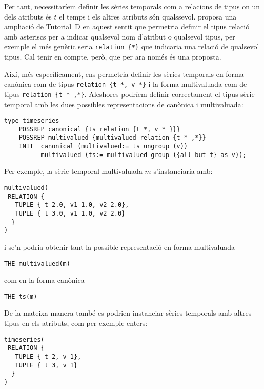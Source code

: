 Per tant, necessitaríem definir les sèries temporals com a relacions
de tipus on un dels atributs és $t$ el temps i els altres atributs són
qualssevol.  \textcite{darwen13:generic_relation_type} proposa una
ampliació de Tutorial~D en aquest sentit que permetria definir el
tipus relació amb asteriscs per a indicar qualsevol nom d'atribut o
qualsevol tipus, per exemple el més genèric seria
\lstinline[style=tutorialD]+relation {*}+ que indicaria una relació de
qualsevol tipus.  Cal tenir en compte, però, que per ara només és una proposta.


Així, més específicament, ens permetria definir les sèries temporals
en forma canònica com de tipus %
\lstinline[style=tutorialD]+relation {t *, v *}+ %
i la forma multivaluada com de tipus %
\lstinline[style=tutorialD]+relation {t * ,*}+.%
Aleshores podríem definir correctament el tipus sèrie temporal amb les
dues possibles representacions de canònica i multivaluada:
\begin{lstlisting}[style=tutorialD]
type timeseries
	POSSREP canonical {ts relation {t *, v * }}}
	POSSREP multivalued {multivalued relation {t * ,*}} 
	INIT  canonical (multivalued:= ts ungroup (v))
	      multivalued (ts:= multivalued group ({all but t} as v));
\end{lstlisting}





Per exemple, la sèrie temporal multivaluada $m$ s'instanciaria amb:
\begin{lstlisting}[style=tutorialD]
multivalued(
 RELATION {
   TUPLE { t 2.0, v1 1.0, v2 2.0},
   TUPLE { t 3.0, v1 1.0, v2 2.0}
  }
)
\end{lstlisting}

i se'n podria obtenir tant la possible representació en forma multivaluada 
\begin{lstlisting}[style=tutorialD]
THE_multivalued(m)
\end{lstlisting}
com en la forma canònica
\begin{lstlisting}[style=tutorialD]
THE_ts(m)
\end{lstlisting}


De la mateixa manera també es podrien instanciar sèries temporals amb altres tipus en els atributs, com per exemple enters:
\begin{lstlisting}[style=tutorialD]
timeseries(
 RELATION {
   TUPLE { t 2, v 1},
   TUPLE { t 3, v 1}
  }
)
\end{lstlisting}



